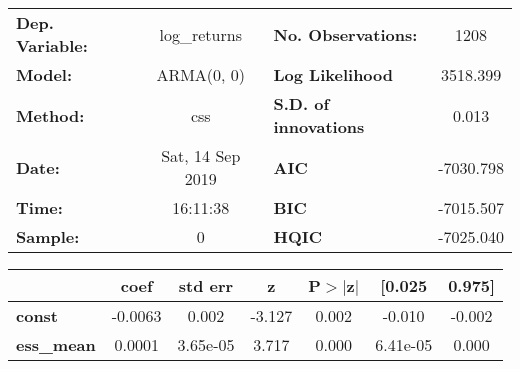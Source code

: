 \begin{center}
\begin{tabular}{lclc}
\toprule
\textbf{Dep. Variable:} &   log\_returns   & \textbf{  No. Observations:  } &    1208     \\
\textbf{Model:}         &    ARMA(0, 0)    & \textbf{  Log Likelihood     } &  3518.399   \\
\textbf{Method:}        &       css        & \textbf{  S.D. of innovations} &   0.013     \\
\textbf{Date:}          & Sat, 14 Sep 2019 & \textbf{  AIC                } & -7030.798   \\
\textbf{Time:}          &     16:11:38     & \textbf{  BIC                } & -7015.507   \\
\textbf{Sample:}        &        0         & \textbf{  HQIC               } & -7025.040   \\
\bottomrule
\end{tabular}
\begin{tabular}{lcccccc}
                   & \textbf{coef} & \textbf{std err} & \textbf{z} & \textbf{P$> |$z$|$} & \textbf{[0.025} & \textbf{0.975]}  \\
\midrule
\textbf{const}     &      -0.0063  &        0.002     &    -3.127  &         0.002        &       -0.010    &       -0.002     \\
\textbf{ess\_mean} &       0.0001  &     3.65e-05     &     3.717  &         0.000        &     6.41e-05    &        0.000     \\
\bottomrule
\end{tabular}
\end{center}

